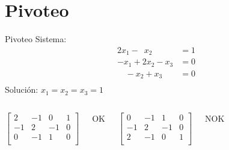\documentclass[9pt, aspectratio=169]{beamer}
\begin{document}
\section{Pivoteo}
%
%
%
%
\begin{frame}{Pivoteo}
	Sistema:
	\begin{align*}
		2 x_1 - \phantom{2} x_2 \phantom{ + x_3}\;\; & = 1 \\
		-x_1 + 2 x_2 - x_3                           & = 0 \\
		\phantom{x_1} -x_2 + x_3                     & = 0 \\
	\end{align*}
	Solución: \( x_1 = x_2 = x_3 = 1 \) \bigskip
	\begin{columns}[c]
		\column{5cm}
		\begin{equation*}
			\left[
				\begin{array}{ccc|c}
					2  & -1 & 0  & 1 \\
					-1 & 2  & -1 & 0 \\
					0  & -1 & 1  & 0 \\
				\end{array} \right]
		\end{equation*}
		\begin{center} OK \end{center} \pause
		\column{5cm}
		\begin{equation*}
			\left[
				\begin{array}{ccc|c}
					0  & -1 & 1  & 0 \\
					-1 & 2  & -1 & 0 \\
					2  & -1 & 0  & 1 \\
				\end{array} \right]
		\end{equation*}
		\begin{center} \alert{NOK} \end{center}
	\end{columns}
\end{frame}
\end{document}
